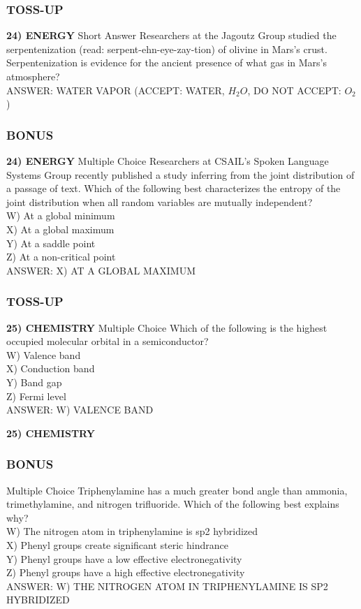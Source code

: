 \newpage

\subsubsection*{TOSS-UP}
\textbf{24) ENERGY}
Short Answer Researchers at the Jagoutz Group studied the serpentenization (read: serpent-ehn-eye-zay-tion) of olivine in Mars's crust. Serpentenization is evidence for the ancient presence of what gas in Mars's atmosphere?
\\ANSWER: WATER VAPOR (ACCEPT: WATER, $H_{2}O$, DO NOT ACCEPT: $O_{2}$)

\subsubsection*{BONUS}
\textbf{24) ENERGY}
Multiple Choice Researchers at CSAIL's Spoken Language Systems Group recently published a study inferring from the joint distribution of a passage of text. Which of the following best characterizes the entropy of the joint distribution when all random variables are mutually independent?
\\W) At a global minimum
\\X) At a global maximum
\\Y) At a saddle point
\\Z) At a non-critical point
\\ANSWER: X) AT A GLOBAL MAXIMUM

\subsubsection*{TOSS-UP}
\textbf{25) CHEMISTRY}
Multiple Choice Which of the following is the highest occupied molecular orbital in a semiconductor?
\\W) Valence band
\\X) Conduction band
\\Y) Band gap
\\Z) Fermi level
\\ANSWER: W) VALENCE BAND

\textbf{25) CHEMISTRY}
\subsubsection*{BONUS}
Multiple Choice Triphenylamine has a much greater bond angle than ammonia, trimethylamine, and nitrogen trifluoride. Which of the following best explains why?
\\W) The nitrogen atom in triphenylamine is sp2 hybridized
\\X) Phenyl groups create significant steric hindrance
\\Y) Phenyl groups have a low effective electronegativity
\\Z) Phenyl groups have a high effective electronegativity
\\ANSWER: W) THE NITROGEN ATOM IN TRIPHENYLAMINE IS SP2 HYBRIDIZED